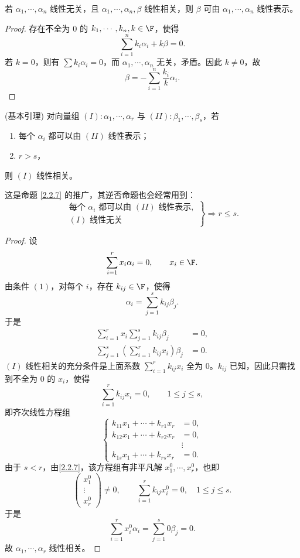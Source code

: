 \begin{lemma}
	若 $\alpha_1,\cdots,\alpha_n$ 线性无关，且
	$\alpha_1,\cdots,\alpha_n,\beta$ 线性相关，则 $\beta$ 可由
	$\alpha_1,\cdots,\alpha_n$ 线性表示。
\end{lemma}
\begin{proof}
	存在不全为 $0$ 的 $k_1,\cdots,k_n,k\in\F$，使得
	\[
	\sum_{i=1}^n k_i\alpha_i+k\beta=0.
	\]
	若 $k=0$，则有 $\sum k_i\alpha_i=0$，而 $\alpha_1,\cdots,\alpha_n$ 无关，矛盾。因此 $k\neq0$，故
	\[
	\beta=-\sum_{i=1}^n\frac{k_i}{k}\alpha_i.
	\]
\end{proof}

\begin{theorem}(基本引理)
	对向量组 $(I):\alpha_1,\cdots,\alpha_r$ 与
	$(II):\beta_1,\cdots,\beta_s$，若
	\begin{enumerate}
		\item 每个 $\alpha_i$ 都可以由 $(II)$ 线性表示；
		\item $r>s$，
	\end{enumerate}
	则 $(I)$ 线性相关。
\end{theorem}
这是命题 \ref{2.2.7} 的推广，其逆否命题也会经常用到：
	\[
	\left.
	\begin{array}{l}
		\text{每个 }\alpha_i\text{ 都可以由 }(II)\text{ 线性表示},\\
		(I)\text{ 线性无关}
	\end{array}
	\right\}
	\Longrightarrow r\leq s.
	\]
\begin{proof}
	设
	\[
	\sum_{i=1}^r x_i\alpha_i=0,\qquad x_i\in\F.
	\]
	由条件 $(1)$，对每个 $i$，存在 $k_{ij}\in\F$，使得
	\[
	\alpha_i=\sum_{j=1}^s k_{ij}\beta_j.
	\]
	于是
	\begin{align*}
		\sum_{i=1}^r x_i\sum_{j=1}^s k_{ij}\beta_j&=0,\\
		\sum_{j=1}^s\left(\sum_{i=1}^r k_{ij}x_i\right)\beta_j&=0.
	\end{align*}
	$(I)$ 线性相关的充分条件是上面系数
	$\sum_{i=1}^r k_{ij}x_i$ 全为 $0$。$k_{ij}$ 已知，因此只需找到不全为 $0$ 的 $x_i$，使得
	\[
	\sum_{i=1}^r k_{ij}x_i=0,\qquad 1\leq j\leq s,
	\]
	即齐次线性方程组
	\[
	\left\{
	\begin{aligned}
		k_{11}x_1+\cdots+k_{r1}x_r&=0,\\
		k_{12}x_1+\cdots+k_{r2}x_r&=0,\\
		&\vdots\\
		k_{1s}x_1+\cdots+k_{rs}x_r&=0.
	\end{aligned}
	\right.
	\]
	由于 $s<r$，由\ref{2.2.7}，该方程组有非平凡解 $x_1^0,\cdots,x_r^0$，也即
	\[
	\begin{pmatrix}
		x_1^0\\
		\vdots\\
		x_r^0
	\end{pmatrix}
	\neq0,
	\qquad
	\sum_{i=1}^r k_{ij}x_i^0=0,\quad 1\leq j\leq s.
	\]
	于是
	\[
	\sum_{i=1}^r x_i^0\alpha_i
	=\sum_{j=1}^s0\beta_j=0.
	\]
	故 $\alpha_1,\cdots,\alpha_r$ 线性相关。
\end{proof}

